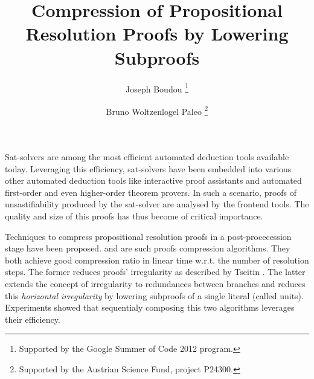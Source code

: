 \documentclass{easychair}
\title{Compression of Propositional Resolution Proofs by Lowering Subproofs}
\author{
  Joseph Boudou\inst{1}
  \thanks{Supported by the Google Summer of Code 2012 program.}
  \and 
  Bruno Woltzenlogel Paleo\inst{2}
  \thanks{Supported by the Austrian Science Fund, project P24300.}
}
\institute{
  Universit\'e Paul Sabatier, Toulouse \\
  \email{joseph.boudou@matabio.net}
  \and 
  Vienna University of Technology \\
  \email{bruno@logic.at}
}
\begin{document}
\maketitle

Sat-solvers are among the most efficient automated deduction tools available today.
Leveraging this efficiency, sat-solvers have been embedded
into various other automated deduction tools
like interactive proof assistants and automated first-order
and even higher-order theorem provers.
In such a scenario, proofs of unsastifiability produced by the sat-solver are analysed by the frontend tools. The quality and
size of this proofs has thus become of critical importance.



Techniques to compress propositional resolution proofs in a post-procecession stage have been
proposed.
\RecyclePivotsIntersection and \LowerUnits \cite{LURPI} are such proofs
compression algorithms. They both achieve good compression ratio in linear time w.r.t. the number of
resolution steps. The former reduces proofs' irregularity as described by Tseitin \cite{Tseitin}. The
latter extends the concept of irregularity to redundances between branches and reduces
this \emph{horizontal irregularity} by lowering subproofs of a single literal (called units).
Experiments showed \cite{LURPI} that sequentialy composing this two algorithms leverages their
efficiency.
\end{document}
